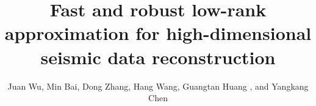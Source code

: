 
\DeclareRobustCommand{\dlo}[1]{}
\DeclareRobustCommand{\wen}[1]{#1}


\title{Fast and robust low-rank approximation for high-dimensional seismic data reconstruction}



\author{Juan Wu\footnotemark[1], Min Bai\footnotemark[1], Dong Zhang\footnotemark[2], Hang Wang\footnotemark[3], Guangtan Huang \footnotemark[3], and Yangkang Chen\footnotemark[3] }

\address{
\footnotemark[1]Key Laboratory of Exploration Technology for Oil and Gas Resources of Ministry of Education\\
Yangtze University\\
Wuhan 430100, China\\
\footnotemark[2] Faculty of Applied Sciences \\
Delft University of Technology \\
Lorentzweg 1, Delft, Netherlands, 2628CJ  \\
\footnotemark[3] School of Earth Sciences \\
Zhejiang University \\
Hangzhou, Zhejiang, 310027 \\
}

%

